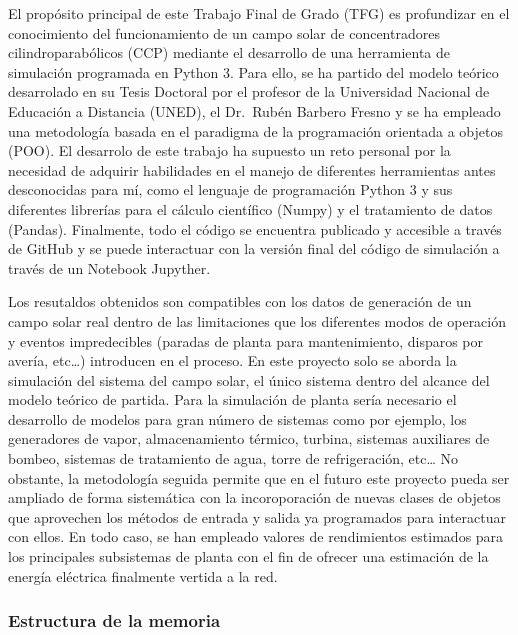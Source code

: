 El propósito principal de este Trabajo Final de Grado (TFG) es
profundizar en el conocimiento del funcionamiento de un campo solar de
concentradores cilindroparabólicos (CCP) mediante el desarrollo de una
herramienta de simulación programada en Python 3. Para ello, se ha
partido del modelo teórico desarrolado en su Tesis Doctoral por el
profesor de la Universidad Nacional de Educación a Distancia (UNED), el
Dr.~Rubén Barbero Fresno y se ha empleado una metodología basada en el
paradigma de la programación orientada a objetos (POO). El desarrolo de
este trabajo ha supuesto un reto personal por la necesidad de adquirir
habilidades en el manejo de diferentes herramientas antes desconocidas
para mí, como el lenguaje de programación Python 3 y sus diferentes
librerías para el cálculo científico (Numpy) y el tratamiento de datos
(Pandas). Finalmente, todo el código se encuentra publicado y accesible
a través de GitHub y se puede interactuar con la versión final del
código de simulación a través de un Notebook Jupyther.

Los resutaldos obtenidos son compatibles con los datos de generación de
un campo solar real dentro de las limitaciones que los diferentes modos
de operación y eventos impredecibles (paradas de planta para
mantenimiento, disparos por avería, etc\ldots{}) introducen en el
proceso. En este proyecto solo se aborda la simulación del sistema del
campo solar, el único sistema dentro del alcance del modelo teórico de
partida. Para la simulación de planta sería necesario el desarrollo de
modelos para gran número de sistemas como por ejemplo, los generadores
de vapor, almacenamiento térmico, turbina, sistemas auxiliares de
bombeo, sistemas de tratamiento de agua, torre de refrigeración,
etc\ldots{} No obstante, la metodología seguida permite que en el futuro
este proyecto pueda ser ampliado de forma sistemática con la
incoroporación de nuevas clases de objetos que aprovechen los métodos de
entrada y salida ya programados para interactuar con ellos. En todo
caso, se han empleado valores de rendimientos estimados para los
principales subsistemas de planta con el fin de ofrecer una estimación
de la energía eléctrica finalmente vertida a la red.

\hypertarget{estructura-de-la-memoria}{%
\subsubsection{Estructura de la
memoria}\label{estructura-de-la-memoria}}

